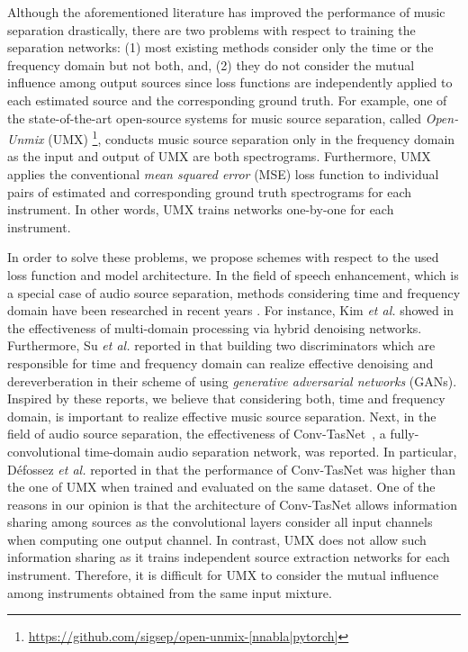 \documentclass{article}
\begin{document}
Although the aforementioned literature has improved the performance of music separation drastically, there are two problems with respect to training the separation networks: (1) most existing methods consider only the time or the frequency domain but not both, and, (2) they do not consider the mutual influence among output sources since loss functions are independently applied to each estimated source and the corresponding ground truth.
For example, one of the state-of-the-art open-source systems for music source separation, called \emph{Open-Unmix} (UMX) \cite{umx}\footnote{\url{https://github.com/sigsep/open-unmix-[nnabla|pytorch]}}, conducts music source separation only in the frequency domain as the input and output of UMX are both spectrograms.
Furthermore, UMX applies the conventional \emph{mean squared error} (MSE) loss function to individual pairs of estimated and corresponding ground truth spectrograms for each instrument.
In other words, UMX trains networks one-by-one for each instrument.

In order to solve these problems, we propose schemes with respect to the used loss function and model architecture.
In the field of speech enhancement, which is a special case of audio source separation, methods considering time and frequency domain have been researched in recent years \cite{mdphd, hifi_gan}.
For instance, Kim \textit{et al.} showed in \cite{mdphd} the effectiveness of multi-domain processing via hybrid denoising networks.
Furthermore, Su \textit{et al.} reported in \cite{hifi_gan} that building two discriminators which are responsible for time and frequency domain can realize effective denoising and dereverberation in their scheme of using \emph{generative adversarial networks} (GANs).
Inspired by these reports, we believe that considering both, time and frequency domain, is important to realize effective music source separation.
Next, in the field of audio source separation, the effectiveness of Conv-TasNet~\cite{conv_tasnet, conv_tasnet_mss}, a fully-convolutional time-domain audio separation network, was reported.
In particular, D\'{e}fossez \textit{et al.} reported in \cite{conv_tasnet_mss} that the performance of Conv-TasNet was higher than the one of UMX when trained and evaluated on the same dataset.
One of the reasons in our opinion is that the architecture of Conv-TasNet allows information sharing among sources as the convolutional layers consider all input channels when computing one output channel. 
In contrast, UMX does not allow such information sharing as it trains independent source extraction networks for each instrument.
Therefore, it is difficult for UMX to consider the mutual influence among instruments obtained from the same input mixture.
\end{document}
